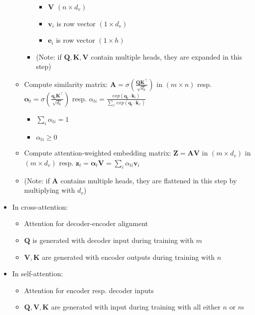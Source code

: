 \begin{itemize}
\begin{itemize}
\begin{itemize}
\begin{itemize}
                \item $\boldsymbol{V}$ $(n \times d_v)$
                \item $\boldsymbol{v}_i$ is row vector $(1 \times d_v)$
                \item $\boldsymbol{e}_i$ is row vector $(1 \times h)$
            \end{itemize}
            \item (Note: if $\boldsymbol{Q,K,V}$ contain multiple heads, they are expanded in this step)
        \end{itemize}
        \item Compute similarity matrix: $\boldsymbol{A} = \sigma(\frac{\boldsymbol{Q}\boldsymbol{K}^\intercal}{\sqrt{d_k}})$ in $(m \times n)$ resp. $\boldsymbol{\alpha}_{t} = \sigma(\frac{\boldsymbol{q}_t\boldsymbol{K}^\intercal}{\sqrt{d_k}})$ resp. $\alpha_{ti} = \frac{exp( \boldsymbol{q}_t \cdot \boldsymbol{k}_i )}{\sum_{i'} exp( \boldsymbol{q}_t \cdot \boldsymbol{k}_{i'} )}$
        \begin{itemize}
            \item $\sum_i \alpha_{ti} = 1$
            \item $\alpha_{ti} \geq 0$
        \end{itemize}
        \item Compute attention-weighted embedding matrix: $\boldsymbol{Z} = \boldsymbol{A}\boldsymbol{V}$ in $(m \times d_v)$ in $(m \times d_v)$ resp. $\boldsymbol{z}_t = \boldsymbol{\alpha}_t\boldsymbol{V} = \sum_i \alpha_{ti} \boldsymbol{v}_i$ 
        \item (Note: if $\boldsymbol{A}$ contains multiple heads, they are flattened in this step by multiplying with $d_v$)
    \end{itemize}
    \item In cross-attention:
    \begin{itemize}
        \item Attention for decoder-encoder alignment
        \item $\boldsymbol{Q}$ is generated with decoder input during training with $m$
        \item $\boldsymbol{V},\boldsymbol{K}$ are generated with encoder outputs during training with $n$
    \end{itemize}
    \item In self-attention:
    \begin{itemize}
        \item Attention for encoder resp. decoder inputs
        \item $\boldsymbol{Q}, \boldsymbol{V},\boldsymbol{K}$ are generated with input during training with all either $n$ or $m$

\end{itemize}
\end{itemize}
